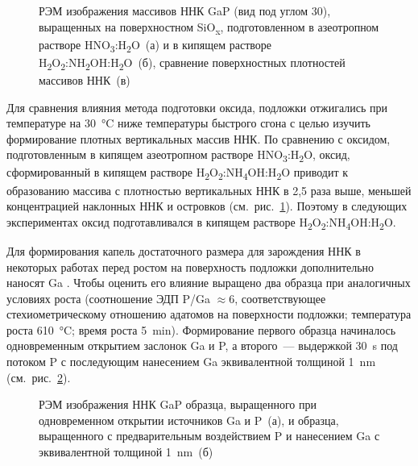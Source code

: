 \begin{figure}[ht]
	\caption{РЭМ изображения массивов ННК GaP (вид под углом 30{\textdegree}), выращенных на поверхностном SiO\textsubscript{x}, подготовленном в азеотропном растворе HNO\textsubscript{3}:H\textsubscript{2}O~(а) и в кипящем растворе H\textsubscript{2}O\textsubscript{2}:NH\textsubscript{2}OH:H\textsubscript{2}O~(б), сравнение поверхностных плотностей массивов ННК~(в)}\label{fig:Image_39}
\end{figure}

Для сравнения влияния метода подготовки оксида, подложки отжигались при температуре на 30~\si{\degreeCelsius} ниже температуры быстрого сгона с целью изучить формирование плотных вертикальных массив ННК. По сравнению с оксидом, подготовленным в кипящем азеотропном растворе HNO\textsubscript{3}:H\textsubscript{2}O, оксид, сформированный в кипящем растворе H\textsubscript{2}O\textsubscript{2}:NH\textsubscript{4}OH:H\textsubscript{2}O приводит к образованию массива с плотностью вертикальных ННК в 2,5 раза выше, меньшей концентрацией наклонных ННК и островков (см.~рис.~\cref{fig:Image_39}). Поэтому в следующих экспериментах оксид подготавливался в кипящем растворе H\textsubscript{2}O\textsubscript{2}:NH\textsubscript{4}OH:H\textsubscript{2}O.

Для формирования капель достаточного размера для зарождения ННК в некоторых работах перед ростом на поверхность подложки дополнительно наносят Ga \cite{Plissard2010}. Чтобы оценить его влияние выращено два образца при аналогичных условиях роста (соотношение ЭДП P/Ga \(\approx 6\), соответствующее стехиометрическому отношению адатомов на поверхности подложки; температура роста 610~\si{\degreeCelsius}; время роста 5~\si{\minute}). Формирование первого образца начиналось одновременным открытием заслонок Ga и P, а второго~--- выдержкой 30~\si{\second} под потоком P с последующим нанесением Ga эквивалентной толщиной 1~\si{\nano\meter} (см.~рис.~\cref{fig:Image_40}).

\begin{figure}[ht]
	\caption{РЭМ изображения ННК GaP образца, выращенного при одновременном открытии источников Ga и P~(а), и образца, выращенного с предварительным воздействием P и нанесением Ga с эквивалентной толщиной 1~{\si{\nano\metre}}~(б)}\label{fig:Image_40}
\end{figure}

